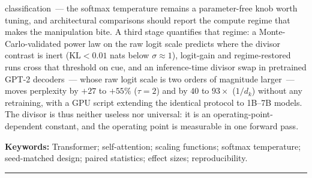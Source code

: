 \documentclass[11pt,a4paper]{article}
\newcommand{\dk}{d_k}
\begin{document}
classification~--- the softmax temperature remains a parameter-free knob worth
tuning, and architectural comparisons should report the compute regime that
makes the manipulation bite. A third stage quantifies that regime: a
Monte-Carlo-validated power law on the raw logit scale predicts where the
divisor contrast is inert ($\mathrm{KL} < 0.01$ nats below $\sigma \approx 1$),
logit-gain and regime-restored runs cross that threshold on cue, and an
inference-time divisor swap in pretrained GPT-2 decoders~--- whose raw logit
scale is two orders of magnitude larger~--- moves perplexity by $+27$ to
$+55\%$ ($\tau = 2$) and by $40$ to $93\times$ ($1/\dk$) without any
retraining, with a GPU script extending the identical protocol to 1B--7B
models. The divisor is thus neither useless nor universal: it is an
operating-point-dependent constant, and the operating point is measurable in
one forward pass.

\vspace{5pt}
\noindent\textbf{Keywords:} Transformer; self-attention; scaling functions; softmax
temperature; seed-matched design; paired statistics; effect sizes; reproducibility.

\vspace{4pt}
\noindent\rule{\textwidth}{0.4pt}







\end{document}
